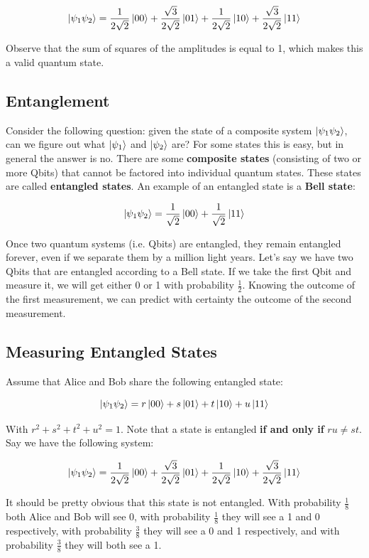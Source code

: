 \documentclass[12pt]{article}
\begin{document}
\[ \ket{\psi_1\psi_2} = \frac{1}{2\sqrt{2}}\ket{00} + \frac{\sqrt{3}}{2\sqrt{2}}\ket{01} + \frac{1}{2\sqrt{2}}\ket{10} + \frac{\sqrt{3}}{2\sqrt{2}}\ket{11} \]

\noindent
Observe that the sum of squares of the amplitudes is equal to 1, which makes this a valid quantum state.

\subsection*{Entanglement}
Consider the following question: given the state of a composite system $\ket{\psi_1\psi_2}$, can we figure out what $\ket{\psi_1}$ and $\ket{\psi_2}$ are?
For some states this is easy, but in general the answer is no.
There are some \textbf{composite states} (consisting of two or more Qbits) that cannot be factored into individual quantum states.
These states are called \textbf{entangled states}.
An example of an entangled state is a \textbf{Bell state}:

\[ \ket{\psi_1\psi_2} = \frac{1}{\sqrt{2}}\ket{00} + \frac{1}{\sqrt{2}}\ket{11} \]

\noindent
Once two quantum systems (i.e. Qbits) are entangled, they remain entangled forever, even if we separate them by a million light years.
Let's say we have two Qbits that are entangled according to  a Bell state.
If we take the first Qbit and measure it, we will get either 0 or 1 with probability $\frac{1}{2}$.
Knowing the outcome of the first measurement, we can predict with certainty the outcome of the second measurement.

\newpage
\subsection*{Measuring Entangled States}
Assume that Alice and Bob share the following entangled state:

\[ \ket{\psi_1\psi_2} = r\ket{00} + s\ket{01} + t\ket{10} + u\ket{11} \]

\noindent
With $r^2 + s^2 + t^2 + u^2 = 1$. Note that a state is entangled \textbf{if and only if} $ru \neq st$.
Say we have the following system:

\[ \ket{\psi_1\psi_2} = \frac{1}{2\sqrt{2}}\ket{00} + \frac{\sqrt{3}}{2\sqrt{2}}\ket{01} + \frac{1}{2\sqrt{2}}\ket{10} + \frac{\sqrt{3}}{2\sqrt{2}}\ket{11} \]

\noindent
It should be pretty obvious that this state is not entangled.
With probability $\frac{1}{8}$ both Alice and Bob will see 0, with probability $\frac{1}{8}$ they will see a 1 and 0 respectively, with probability $\frac{3}{8}$ they will see a 0 and 1 respectively, and with probability $\frac{3}{8}$ they will both see a 1.
\end{document}
